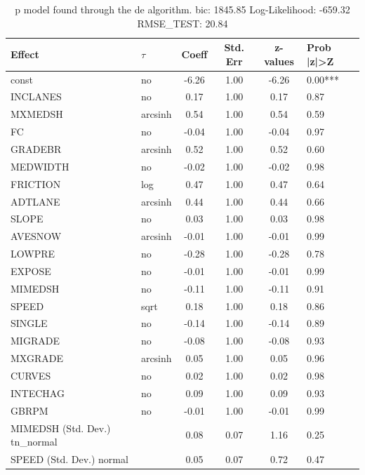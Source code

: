 \begin{table}
	\caption{p model found through the de algorithm. bic: 1845.85 Log-Likelihood: -659.32 RMSE_TEST: 20.84}
	\begin{center}
		\begin{tabular}{|l|l|c|c|c|l|}
			\hline
			Effect & $\tau$ & Coeff & Std. Err & z-values & Prob |z|>Z \\
			\hline
			const & no & -6.26 & 1.00 & -6.26 & 0.00*** \\
			\hline
			INCLANES & no & 0.17 & 1.00 & 0.17 & 0.87 \\
			\hline
			MXMEDSH & arcsinh & 0.54 & 1.00 & 0.54 & 0.59 \\
			\hline
			FC & no & -0.04 & 1.00 & -0.04 & 0.97 \\
			\hline
			GRADEBR & arcsinh & 0.52 & 1.00 & 0.52 & 0.60 \\
			\hline
			MEDWIDTH & no & -0.02 & 1.00 & -0.02 & 0.98 \\
			\hline
			FRICTION & log & 0.47 & 1.00 & 0.47 & 0.64 \\
			\hline
			ADTLANE & arcsinh & 0.44 & 1.00 & 0.44 & 0.66 \\
			\hline
			SLOPE & no & 0.03 & 1.00 & 0.03 & 0.98 \\
			\hline
			AVESNOW & arcsinh & -0.01 & 1.00 & -0.01 & 0.99 \\
			\hline
			LOWPRE & no & -0.28 & 1.00 & -0.28 & 0.78 \\
			\hline
			EXPOSE & no & -0.01 & 1.00 & -0.01 & 0.99 \\
			\hline
			MIMEDSH & no & -0.11 & 1.00 & -0.11 & 0.91 \\
			\hline
			SPEED & sqrt & 0.18 & 1.00 & 0.18 & 0.86 \\
			\hline
			SINGLE & no & -0.14 & 1.00 & -0.14 & 0.89 \\
			\hline
			MIGRADE & no & -0.08 & 1.00 & -0.08 & 0.93 \\
			\hline
			MXGRADE & arcsinh & 0.05 & 1.00 & 0.05 & 0.96 \\
			\hline
			CURVES & no & 0.02 & 1.00 & 0.02 & 0.98 \\
			\hline
			INTECHAG & no & 0.09 & 1.00 & 0.09 & 0.93 \\
			\hline
			GBRPM & no & -0.01 & 1.00 & -0.01 & 0.99 \\
			\hline
			MIMEDSH (Std. Dev.) tn_normal &  & 0.08 & 0.07 & 1.16 & 0.25 \\
			\hline
			SPEED (Std. Dev.) normal &  & 0.05 & 0.07 & 0.72 & 0.47 \\

\end{tabular}
\end{center}
\end{table}
